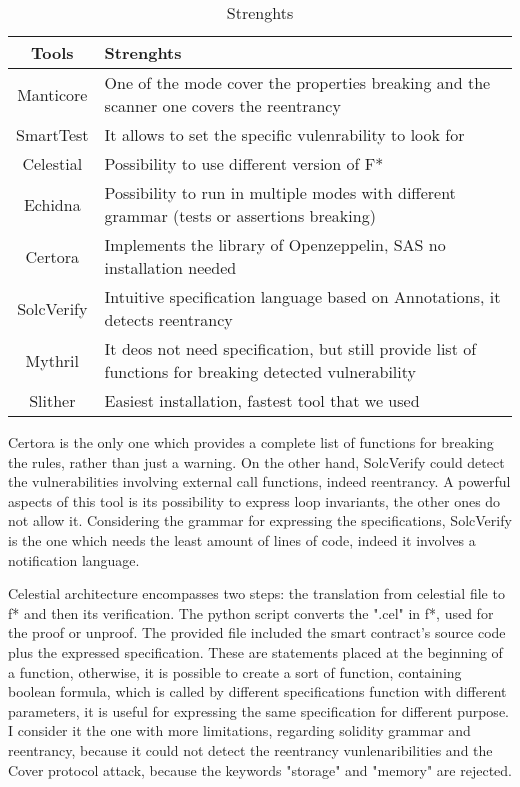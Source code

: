 \begin{center}
\begin{table*}
    \caption{Strenghts}
        \label{tab:Strenghts}
        \begin{tabular}{cl}
        \toprule
            Tools  &  Strenghts \\
            \midrule
            Manticore & One of the mode cover the properties breaking and the scanner one covers the reentrancy\\
            SmartTest & It allows to set the specific vulenrability to look for  \\
            Celestial & Possibility to use different version of F*  \\
            Echidna &  Possibility to run in multiple modes with different grammar (tests or assertions breaking)\\
            Certora & Implements the library of Openzeppelin, SAS no installation needed \\ 
            SolcVerify & Intuitive specification language based on Annotations, it detects reentrancy\\
            Mythril & It deos not need specification, but still provide list of functions for breaking detected vulnerability  \\ 
            Slither & Easiest installation, fastest tool that we used \\ 
        \bottomrule
        \end{tabular}
    \end{table*}
\end{center}
Certora is the only one which provides a complete list of functions for breaking the rules, rather than just a warning. 
On the other hand, SolcVerify could detect the vulnerabilities involving external call functions, indeed reentrancy. A powerful aspects of this tool is its possibility to express 
loop invariants, the other ones do not allow it.
Considering the grammar for expressing the specifications, SolcVerify is the one which needs the least amount of lines of code, indeed it involves a notification language.

Celestial architecture encompasses two steps: the translation from celestial file to f* and then its verification. 
The python script converts the ".cel" in f*, used for the proof or unproof.
The provided file included the smart contract's source code plus the expressed specification. These are statements placed at the beginning of a function, otherwise, it is possible to create a sort of function, 
containing boolean formula, which is called by different specifications function with different parameters, it is useful for expressing the same specification for different purpose.  I consider it the one with more limitations, regarding solidity grammar and reentrancy, 
because it could not detect the reentrancy vunlenaribilities and the Cover protocol attack, because the keywords "storage" and "memory" are rejected. 

